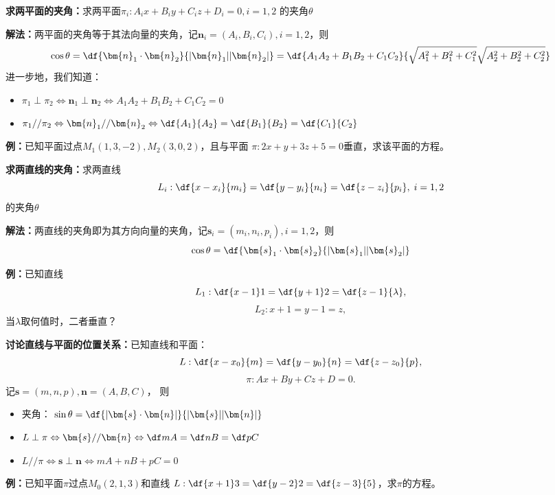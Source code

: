 \begin{thx}
	{\bf 求两平面的夹角：}求两平面$\pi_i:A_ix+B_iy+C_iz+D_i=0,i=1,2$
	的夹角$\theta$
	
	{\bf 解法：}两平面的夹角等于其法向量的夹角，记$\bm{n}_i=(A_i,B_i,C_i),i=1,2$，则
	$$\cos\theta=\df{\bm{n}_1\cdot\bm{n}_2}{|\bm{n}_1||\bm{n}_2|}
	=\df{A_1A_2+B_1B_2+C_1C_2}{\sqrt{A_1^2+B_1^2+C_1^2}
	\sqrt{A_2^2+B_2^2+C_2^2}}$$
	进一步地，我们知道：
	\begin{itemize}
	  \item $\pi_1\perp\pi_2 \Leftrightarrow\bm{n}_1\perp\bm{n}_2 
		  \Leftrightarrow A_1A_2+B_1B_2+C_1C_2=0$
	  \item $\pi_1//\pi_2 \Leftrightarrow\bm{n}_1//\bm{n}_2 
		  \Leftrightarrow\df{A_1}{A_2}=\df{B_1}{B_2}=\df{C_1}{C_2}$
	\end{itemize}
\end{thx}

{\bf 例：}已知平面过点$M_1(1,3,-2),M_2(3,0,2)$，且与平面
$\pi:2x+y+3z+5=0$垂直，求该平面的方程。

\begin{thx}
	{\bf 求两直线的夹角：}求两直线
	$$L_i:\df{x-x_i}{m_i}=\df{y-y_i}{n_i}=\df{z-z_i}{p_i},\;i=1,2$$
	的夹角$\theta$ 
	
	{\bf 解法：}两直线的夹角即为其方向向量的夹角，记$\bm{s}_i=(m_i,n_i,p_i),i=1,2$，则
	$${\cos\theta=\df{\bm{s}_1\cdot\bm{s}_2}{|\bm{s}_1||\bm{s}_2|}}$$
\end{thx}

{\bf 例：}已知直线
$$L_1:\df{x-1}1=\df{y+1}2=\df{z-1}{\lambda},$$
$$L_2:x+1=y-1=z,$$
当$\lambda$取何值时，二者垂直？

\begin{thx}
	{\bf 讨论直线与平面的位置关系：}已知直线和平面：
	$$L:\df{x-x_0}{m}=\df{y-y_0}{n}=\df{z-z_0}{p},$$
	$$\pi:Ax+By+Cz+D=0.$$ 
	记$\bm{s}=(m,n,p),\bm{n}=(A,B,C)$， 则
	\begin{itemize}
	  \item 夹角：
	  $\sin\theta=\df{|\bm{s}\cdot\bm{n}|}{|\bm{s}||\bm{n}|}$ 
	  \item $L\perp\pi \Leftrightarrow\bm{s}//\bm{n} 
	  \Leftrightarrow \df mA=\df nB=\df pC$ 
	  \item $L//\pi \Leftrightarrow\bm{s}\perp\bm{n} 
	  \Leftrightarrow mA+nB+pC=0$
	\end{itemize}
\end{thx}

{\bf 例：}已知平面$\pi$过点$M_0(2,1,3)$和直线
$L:\df{x+1}3=\df{y-2}2=\df{z-3}{5}$，求$\pi$的方程。

